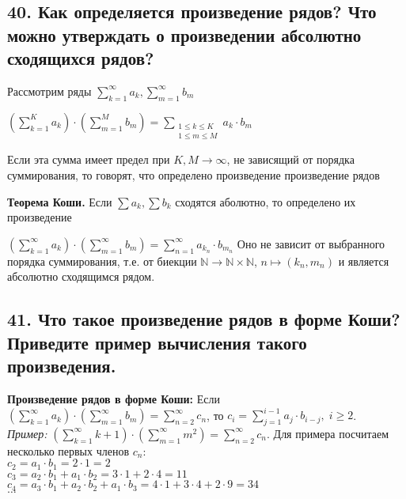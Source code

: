 \documentclass[a4paper, fleqn]{article}
\begin{document}
    \subsection*{40. Как определяется произведение рядов? Что можно утверждать о произведении абсолютно
    сходящихся рядов?}
    Рассмотрим ряды $\sum_{k=1}^\infty a_k, \sum_{m=1}^{\infty} b_m$
        
    $\displaystyle 
        \left(\sum_{k=1}^K a_k \right) \cdot \left(\sum_{m=1}^M b_m \right) = \sum_{\substack{1 \leq k \leq K \\
        1 \leq m \leq M}}a_k \cdot b_m
    $
    
    Если эта сумма имеет предел при $K, M \to \infty$, не зависящий от порядка
    суммирования, то говорят, что определено произведение произведение рядов

    \textbf{Теорема Коши.}
    Если $\sum a_k, \sum b_k$ сходятся аболютно, то определено их произведение
    
    $\left(\sum_{k=1}^\infty a_k \right) \cdot \left(\sum_{m=1}^\infty b_m \right) = 
    \sum_{n=1}^{\infty} a_{k_n} \cdot b_{m_n}$
    Оно не зависит от выбранного порядка суммирования, т.е. от биекции $\mathbb{N} \to \mathbb{N}\times\mathbb{N}$,
    $n \mapsto (k_n, m_n)$ и является абсолютно сходящимся рядом.
    
    \subsection*{41. Что такое произведение рядов в форме Коши? Приведите пример вычисления такого произведения.}
    \textbf{Произведение рядов в форме Коши:} Если $\left(\sum_{k=1}^{\infty} a_k\right) \cdot \left(\sum_{m=1}^{\infty} b_m \right) = \sum_{n=2}^{\infty} c_n$, то $c_i = \sum\limits_{j = 1}^{i - 1} a_j \cdot b_{i - j}, \; i \geq 2$. \\
    \textit{Пример:} $\left(\sum\limits_{k=1}^{\infty} k + 1 \right) \cdot \left( \sum\limits_{m = 1}^{\infty} m^2 \right) = \sum\limits_{n = 2}^{\infty} c_n$. Для примера посчитаем несколько первых членов $c_n$: \\
    $c_2 = a_1 \cdot b_1 = 2 \cdot 1 = 2$\\
    $c_3 = a_2 \cdot b_1 + a_1 \cdot b_2 = 3 \cdot 1 + 2 \cdot 4 = 11$ \\
    $c_4 = a_3 \cdot b_1 + a_2 \cdot b_2 + a_1 \cdot b_3 = 4 \cdot 1 + 3 \cdot 4 + 2 \cdot 9 = 34$ \\
    $\dots$ \\
\end{document}
